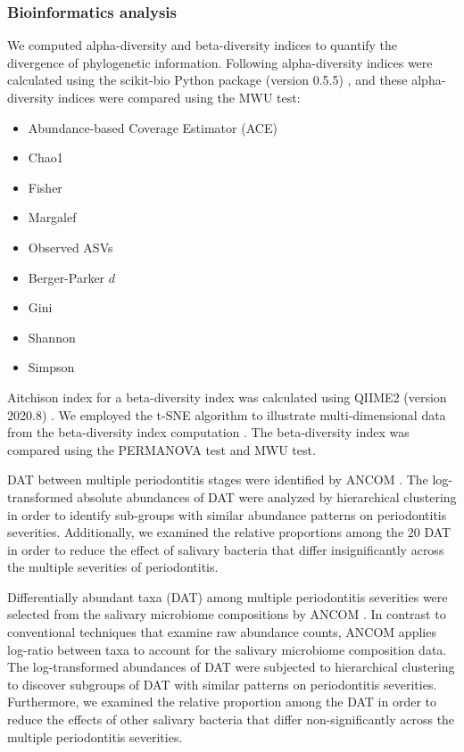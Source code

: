 \documentclass[11pt, a4paper, onecolumn, oneside]{report}
\begin{document}
            \subsubsection{Bioinformatics analysis}
                We computed alpha-diversity and beta-diversity indices to quantify the divergence of phylogenetic information. Following alpha-diversity indices were calculated using the scikit-bio Python package (version 0.5.5) \cite{scikit-bio-1}, and these alpha-diversity indices were compared using the MWU test:
                \begin{itemize}[noitemsep, nolistsep]
                    \item Abundance-based Coverage Estimator (ACE) \cite{ACE-1}
                    \item Chao1 \cite{chao1-1}
                    \item Fisher \cite{fisher-1}
                    \item Margalef \cite{margalef-1}
                    \item Observed ASVs \cite{observed-ASVs-1}
                    \item Berger-Parker $d$ \cite{Berger-1}
                    \item Gini \cite{Gini-1}
                    \item Shannon \cite{Shannon-1}
                    \item Simpson \cite{Simpson-1}
                \end{itemize}

                Aitchison index for a beta-diversity index was calculated using QIIME2 (version 2020.8) \cite{Aitchison-1, QIIME2-1}. We employed the t-SNE algorithm to illustrate multi-dimensional data from the beta-diversity index computation \cite{tSNE-1}. The beta-diversity index was compared using the PERMANOVA test \cite{PERMANOVA-1, PERMANOVA-2} and MWU test.

                DAT between multiple periodontitis stages were identified by ANCOM \cite{ANCOM-1}. The log-transformed absolute abundances of DAT were analyzed by hierarchical clustering in order to identify sub-groups with similar abundance patterns on periodontitis severities. Additionally, we examined the relative proportions among the 20 DAT in order to reduce the effect of salivary bacteria that differ insignificantly across the multiple severities of periodontitis.

                Differentially abundant taxa (DAT) among multiple periodontitis severities were selected from the salivary microbiome compositions by ANCOM \cite{ANCOM-1}. In contrast to conventional techniques that examine raw abundance counts, ANCOM applies log-ratio between taxa to account for the salivary microbiome composition data. The log-transformed abundances of DAT were subjected to hierarchical clustering to discover subgroups of DAT with similar patterns on periodontitis severities. Furthermore, we examined the relative proportion among the DAT in order to reduce the effects of other salivary bacteria that differ non-significantly across the multiple periodontitis severities.
\end{document}
